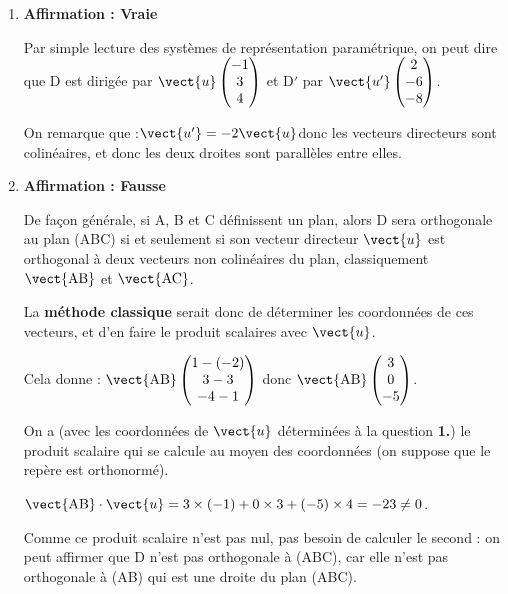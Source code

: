 \medskip

\begin{enumerate}
\item \textbf{Affirmation : Vraie}

Par simple lecture des systèmes de représentation paramétrique, on peut dire que D est dirigée par $\vect{u}\begin{pmatrix}-1\\3\\4\end{pmatrix}$ et D$'$ par $\vect{u'}\begin{pmatrix} 2\\-6\\-8	\end{pmatrix}$.

On remarque que :\quad $\vect{u'} = -2\vect{u}$\quad donc les vecteurs directeurs sont colinéaires, et donc les deux droites sont parallèles entre elles.

\item \textbf{Affirmation : Fausse}

De façon générale, si A, B et C définissent un plan, alors D sera orthogonale au plan (ABC) si et seulement si son vecteur directeur $\vect{u}$ est orthogonal à deux vecteurs non colinéaires du plan, classiquement $\vect{\mathrm{AB}}$ et $\vect{\mathrm{AC}}$.

La \textbf{méthode classique} serait donc de déterminer les coordonnées de ces vecteurs, et d'en faire le produit scalaires avec $\vect{u}$.

Cela donne : \quad $\vect{\mathrm{AB}} \begin{pmatrix}1 - (-2)\\3 - 3\\-4 - 1\end{pmatrix}$ donc $\vect{\mathrm{AB}} \begin{pmatrix}3\\0\\-5\end{pmatrix}$.

On a (avec les coordonnées de $\vect{u}$ déterminées à la question \textbf{1.}) le produit scalaire qui se calcule au moyen des coordonnées (on suppose que le repère est orthonormé).

$\vect{\mathrm{AB}}\cdot\vect{u} = 3\times (-1) + 0 \times 3 + (-5) \times 4 = -23 \neq 0$.

Comme ce produit scalaire n'est pas nul, pas besoin de calculer le second : on peut affirmer que D n'est pas orthogonale à (ABC), car elle n'est pas orthogonale à (AB) qui est une droite du plan (ABC).


\end{enumerate}

